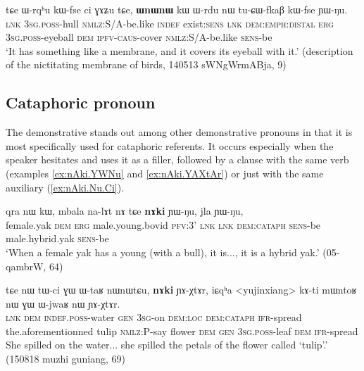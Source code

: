 \begin{exe}
\ex \label{ex:WnWnW.kW}
 \gll
tɕe ɯ-rqʰu kɯ-fse ci ɣɤʑu tɕe, \textbf{ɯnɯnɯ} kɯ ɯ-rdu nɯ tu-ɕɯ-fkaβ kɯ-fse ɲɯ-ŋu. \\
\textsc{lnk} \textsc{3sg.poss}-hull \textsc{nmlz}:S/A-be.like \textsc{indef}  exist:\textsc{sens} \textsc{lnk} \textsc{dem:emph:distal} \textsc{erg} \textsc{3sg.poss}-eyeball \textsc{dem} \textsc{ipfv}-\textsc{caus}-cover  \textsc{nmlz}:S/A-be.like \textsc{sens}-be \\
\glt `It has something like a membrane, and it covers its eyeball with it.' (description of the nictitating membrane of birds, 140513 sWNgWrmABja, 9)
\end{exe}

\subsection{Cataphoric pronoun} \label{sec:cataph.pron}
The demonstrative  stands out among other demonstrative pronouns in that it is most specifically used for cataphoric referents. It occurs especially when the speaker hesitates and uses it as a filler, followed by a clause with the same verb (examples \ref{ex:nAki.YWNu} and \ref{ex:nAki.YAXtAr}) or just with the same auxiliary (\ref{ex:nAki.Nu.Ci}).

\begin{exe}
\ex \label{ex:nAki.YWNu}
 \gll
qra nɯ kɯ, mbala na-lɤt nɤ tɕe \textbf{nɤki} ɲɯ-ŋu, jla ɲɯ-ŋu, \\
female.yak \textsc{dem} \textsc{erg} male.young.bovid \textsc{pfv}:3' \textsc{lnk} \textsc{lnk} \textsc{dem:cataph} \textsc{sens}-be male.hybrid.yak \textsc{sens}-be \\
\glt `When a female yak has a young (with a bull), it is..., it is a hybrid yak.' (05-qambrW, 64)
\end{exe}

\begin{exe}
\ex \label{ex:nAki.YAXtAr}
 \gll tɕe nɯ tɯ-ci ɣɯ ɯ-taʁ nɯnɯtɕu, \textbf{nɤki} ɲɤ-χtɤr, iɕqʰa <yujinxiang> kɤ-ti mɯntoʁ nɯ ɣɯ  ɯ-jwaʁ nɯ ɲɤ-χtɤr.  \\
\textsc{lnk} \textsc{dem} \textsc{indef.poss}-water \textsc{gen} \textsc{3sg}-on \textsc{dem:loc} \textsc{dem:cataph} \textsc{ifr}-spread the.aforementionned tulip \textsc{nmlz}:P-say flower \textsc{dem} \textsc{gen} \textsc{3sg.poss}-leaf \textsc{dem} \textsc{ifr}-spread \\
\glt She spilled on the water...  she spilled the petals of the flower called `tulip'.' (150818 muzhi guniang, 69)
\end{exe}

